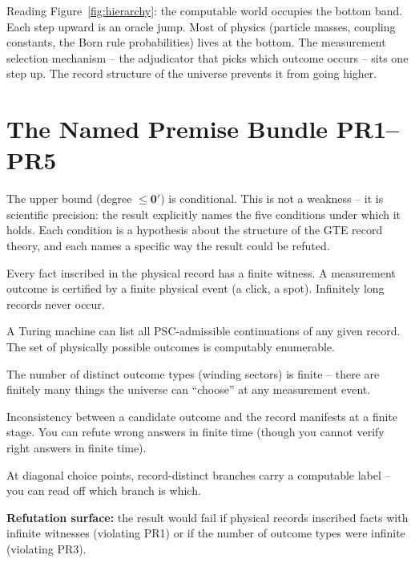 \documentclass[11pt,a4paper]{article}
\newcommand{\zerp}{\mathbf{0}'}
\begin{document}
\noindent
Reading Figure~\ref{fig:hierarchy}: the computable world occupies the bottom
band. Each step upward is an oracle jump. Most of physics (particle masses,
coupling constants, the Born rule probabilities) lives at the bottom.
The measurement selection mechanism -- the adjudicator that picks which outcome
occurs -- sits one step up.  The record structure of the universe prevents it
from going higher.

\section{The Named Premise Bundle PR1--PR5}
\label{sec:premises}

The upper bound (degree $\leq \zerp$) is conditional.  This is not a weakness --
it is scientific precision: the result explicitly names the five conditions
under which it holds.  Each condition is a hypothesis about the structure of
the GTE record theory, and each names a specific way the result could be
refuted.

\begin{tcolorbox}[colback=boxgray,colframe=gray!50,
  title={The Premise Bundle PR1--PR5 (Definition from P51)}]
\small
\begin{description}[leftmargin=3em,itemsep=4pt]
  \item[PR1 (Finite-witness record truth):] Every fact inscribed in the
    physical record has a finite witness. A measurement outcome is certified
    by a finite physical event (a click, a spot).  Infinitely long records
    never occur.
  \item[PR2 (Effective candidate enumeration):] A Turing machine can list
    all PSC-admissible continuations of any given record. The set of
    physically possible outcomes is computably enumerable.
  \item[PR3 (Finite sector structure):] The number of distinct outcome types
    (winding sectors) is finite -- there are finitely many things the
    universe can ``choose'' at any measurement event.
  \item[PR4 ($\Pi_1$ admissibility):] Inconsistency between a candidate
    outcome and the record manifests at a finite stage. You can refute wrong
    answers in finite time (though you cannot verify right answers in
    finite time).
  \item[PR5 (Record readout):] At diagonal choice points, record-distinct
    branches carry a computable label -- you can read off which branch is
    which.
\end{description}

\medskip
\noindent\textbf{Refutation surface:} the result would fail if physical records
inscribed facts with infinite witnesses (violating PR1) or if the number of
outcome types were infinite (violating PR3).
\end{tcolorbox}
\end{document}
